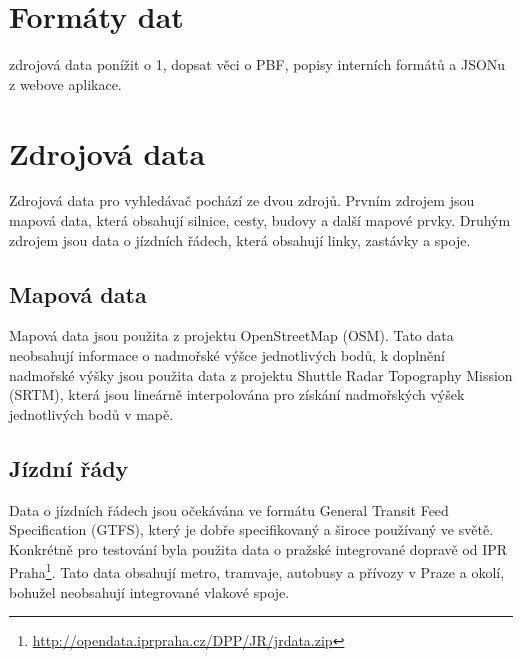 \chapter{Formáty dat}
\TODO zdrojová data ponížit o 1, dopsat věci o PBF, popisy interních formátů a
JSONu z webove aplikace.
\chapter{Zdrojová data}

Zdrojová data pro vyhledávač pochází ze dvou zdrojů. Prvním zdrojem jsou mapová
data, která obsahují silnice, cesty, budovy a další mapové prvky. Druhým zdrojem
jsou data o jízdních řádech, která obsahují linky, zastávky a spoje.

\section{Mapová data}
Mapová data jsou použita z projektu OpenStreetMap (OSM). Tato data neobsahují
informace o nadmořské výšce jednotlivých bodů, k doplnění nadmořské výšky jsou
použita data z projektu Shuttle Radar Topography Mission (SRTM), která jsou
lineárně interpolována pro získání nadmořských výšek jednotlivých bodů v mapě.

\section{Jízdní řády}
Data o jízdních řádech jsou očekávána ve formátu General Transit Feed
Specification (GTFS), který je dobře specifikovaný a široce používaný ve světě.
Konkrétně pro testování byla použita data o pražské integrované dopravě od IPR
Praha\footnote{\url{http://opendata.iprpraha.cz/DPP/JR/jrdata.zip}}. Tato data
obsahují metro, tramvaje, autobusy a přívozy v Praze a okolí, bohužel neobsahují
integrované vlakové spoje.

